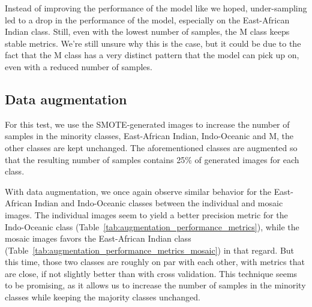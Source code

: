 Instead of improving the performance of the model like we hoped, under-sampling led to a drop in the performance of the model, especially
on the East-African Indian class. Still, even with the lowest number of samples, the M class keeps stable metrics. We're still unsure why
this is the case, but it could be due to the fact that the M class has a very distinct pattern that the model can pick up on, even with
a reduced number of samples.

\subsection{Data augmentation}
\label{subsec:data_augmentation}

For this test, we use the SMOTE-generated images to increase the number of samples in the minority classes, East-African Indian, Indo-Oceanic and M,
the other classes are kept unchanged. The aforementioned classes are augmented so that the resulting number of samples contains 25\% of generated images
for each class.

\label{subsubsec:results_data_augmentation}

With data augmentation, we once again observe similar behavior for the East-African Indian and Indo-Oceanic classes between the individual and mosaic images.
The individual images seem to yield a better precision metric for the Indo-Oceanic class (Table~\ref{tab:augmentation_performance_metrics}), while the mosaic
images favors the East-African Indian class (Table~\ref{tab:augmentation_performance_metrics_mosaic}) in that regard. But this time, those two classes are
roughly on par with each other, with metrics that are close, if not slightly better than with cross validation. This technique seems to be promising, as it
allows us to increase the number of samples in the minority classes while keeping the majority classes unchanged.

